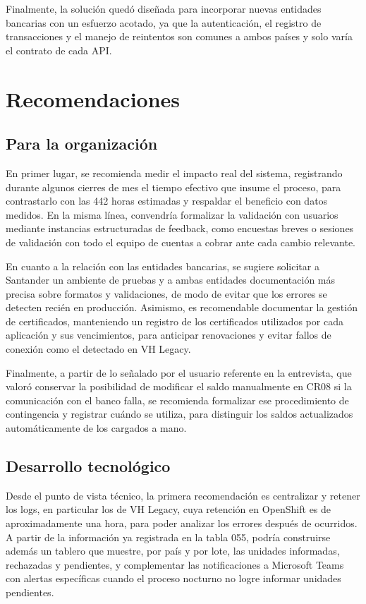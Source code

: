 Finalmente, la solución quedó diseñada para incorporar nuevas entidades bancarias con un esfuerzo acotado, ya que la autenticación, el registro de transacciones y el manejo de reintentos son comunes a ambos países y solo varía el contrato de cada API.

\section{Recomendaciones}

\subsection{Para la organización}

En primer lugar, se recomienda medir el impacto real del sistema, registrando durante algunos cierres de mes el tiempo efectivo que insume el proceso, para contrastarlo con las 442 horas estimadas y respaldar el beneficio con datos medidos. En la misma línea, convendría formalizar la validación con usuarios mediante instancias estructuradas de feedback, como encuestas breves o sesiones de validación con todo el equipo de cuentas a cobrar ante cada cambio relevante.

En cuanto a la relación con las entidades bancarias, se sugiere solicitar a Santander un ambiente de pruebas y a ambas entidades documentación más precisa sobre formatos y validaciones, de modo de evitar que los errores se detecten recién en producción. Asimismo, es recomendable documentar la gestión de certificados, manteniendo un registro de los certificados utilizados por cada aplicación y sus vencimientos, para anticipar renovaciones y evitar fallos de conexión como el detectado en VH Legacy.

Finalmente, a partir de lo señalado por el usuario referente en la entrevista, que valoró conservar la posibilidad de modificar el saldo manualmente en CR08 si la comunicación con el banco falla, se recomienda formalizar ese procedimiento de contingencia y registrar cuándo se utiliza, para distinguir los saldos actualizados automáticamente de los cargados a mano.

\subsection{Desarrollo tecnológico}

Desde el punto de vista técnico, la primera recomendación es centralizar y retener los logs, en particular los de VH Legacy, cuya retención en OpenShift es de aproximadamente una hora, para poder analizar los errores después de ocurridos. A partir de la información ya registrada en la tabla 055, podría construirse además un tablero que muestre, por país y por lote, las unidades informadas, rechazadas y pendientes, y complementar las notificaciones a Microsoft Teams con alertas específicas cuando el proceso nocturno no logre informar unidades pendientes.


